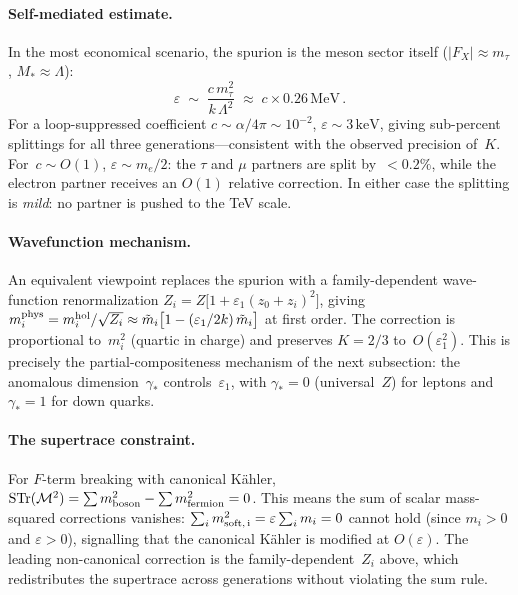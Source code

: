 \documentclass[12pt,a4paper]{article}
\newcommand{\keV}{\,\mathrm{keV}}
\newcommand{\MeV}{\,\mathrm{MeV}}
\begin{document}
\paragraph{Self-mediated estimate.}
In the most economical scenario, the spurion is the meson sector itself
($|F_X| \approx m_\tau$, $M_* \approx \Lambda$):
\begin{equation}
  \varepsilon \;\sim\; \frac{c\,m_\tau^2}{k\,\Lambda^2}
  \;\approx\; c \times 0.26\MeV\,.
  \label{eq:eps_self}
\end{equation}
For a loop-suppressed coefficient $c \sim \alpha/4\pi \sim 10^{-2}$,
$\varepsilon \sim 3\keV$, giving sub-percent splittings for all
three generations---consistent with the observed precision of~$K$.
For~$c \sim O(1)$, $\varepsilon \sim m_e/2$: the $\tau$ and $\mu$
partners are split by~$<0.2\%$, while the electron partner receives an
$O(1)$ relative correction.  In either case the splitting is
\emph{mild}: no partner is pushed to the TeV scale.

\paragraph{Wavefunction mechanism.}
An equivalent viewpoint replaces the spurion with a family-dependent
wave-function renormalization $Z_i = Z\bigl[1 + \varepsilon_1
(z_0{+}z_i)^2\bigr]$, giving
$m_i^{\rm phys} = m_i^{\rm hol}/\sqrt{Z_i}
\approx \tilde m_i\bigl[1 - (\varepsilon_1/2k)\,\tilde m_i\bigr]$
at first order.  The correction is
proportional to~$m_i^2$ (quartic in charge) and preserves $K = 2/3$
to~$O(\varepsilon_1^2)$.  This is precisely the partial-compositeness
mechanism of the next subsection: the anomalous dimension~$\gamma_*$
controls~$\varepsilon_1$, with $\gamma_* = 0$ (universal~$Z$) for
leptons and $\gamma_* = 1$ for down quarks.

\paragraph{The supertrace constraint.}
For $F$-term breaking with canonical K\"ahler,
$\mathrm{STr}(\mathcal{M}^2) = \sum m^2_{\rm boson} - \sum m^2_{\rm fermion} = 0$.
This means the sum of scalar mass-squared corrections vanishes:
$\sum_i m^2_{\rm soft,\,i} = \varepsilon \sum_i m_i = 0$
cannot hold (since $m_i > 0$ and $\varepsilon > 0$), signalling that
the canonical K\"ahler is modified at $O(\varepsilon)$.  The leading
non-canonical correction is the family-dependent~$Z_i$ above, which
redistributes the supertrace across generations without violating the
sum rule.
\end{document}

